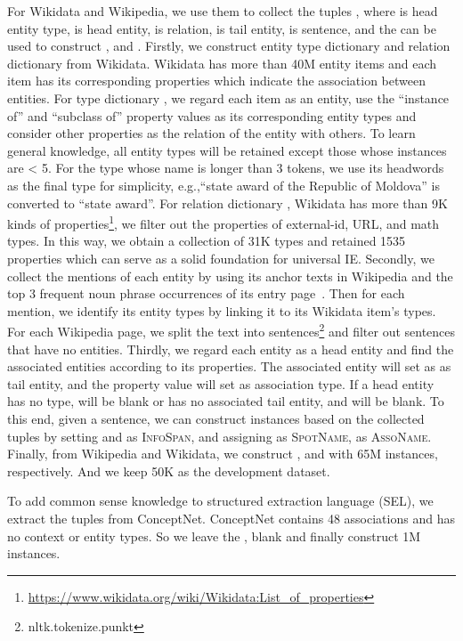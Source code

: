 \documentclass[11pt]{article}
\begin{document}
For Wikidata and Wikipedia, we use them to collect the tuples , where  is head entity type,  is head entity,  is relation,  is tail entity,  is sentence, and the  can be used to construct ,  and . Firstly, we construct entity type dictionary  and relation dictionary  from Wikidata. Wikidata has more than 40M entity items and each item has its corresponding properties which indicate the association between entities. For type dictionary , we regard each item as an entity, use the “instance of” and “subclass of” property values as its corresponding entity types and consider other properties as the relation of the entity with others. To learn general knowledge, all entity types will be retained except those whose instances are < 5. For the type whose name is longer than 3 tokens, we use its headwords as the final type for simplicity, e.g.,“state award of the Republic of Moldova” is converted to “state award”. For relation dictionary , Wikidata has more than 9K kinds of properties\footnote{\url{https://www.wikidata.org/wiki/Wikidata:List_of_properties}}, we filter out the properties of external-id, URL, and math types. In this way, we obtain a collection of 31K types and retained 1535 properties which can serve as a solid foundation for universal IE. Secondly, we collect the mentions of each entity by using its anchor texts in Wikipedia and the top 3 frequent noun phrase occurrences of its entry page~\citep{li-etal-2010-generating}. Then for each mention, we identify its entity types by linking it to its Wikidata item's types. For each Wikipedia page, we split the text into sentences\footnote{nltk.tokenize.punkt} and filter out sentences that have no entities. Thirdly, we regard each entity as a head entity and find the associated entities according to its properties. The associated entity will set as as tail entity, and the property value will set as association type. If a head entity has no type,  will be blank or has no associated tail entity,  and  will be blank. To this end, given a sentence, we can construct instances based on the collected tuples  by setting  and  as \textsc{InfoSpan}, and assigning  as \textsc{SpotName},  as \textsc{AssoName}. Finally, from Wikipedia and Wikidata, we construct ,  and  with 65M instances, respectively. And we keep 50K as the development dataset. 

To add common sense knowledge to structured extraction language (SEL), we extract the tuples  from ConceptNet. ConceptNet contains 48 associations and has no context or entity types. So we leave the ,   blank and finally construct 1M instances.
\end{document}
